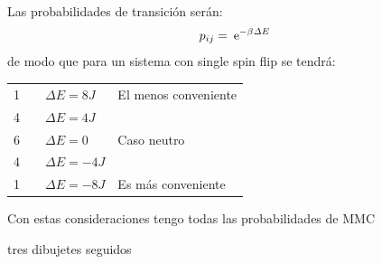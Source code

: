 \documentclass[10pt,oneside]{CBFT_book}
\begin{document}
Las probabilidades de transición serán:
\[
	p_{ij} = \:\mathrm{e}^{-\beta \Delta E }
\]
de modo que para un sistema con single spin flip se tendrá:
\begin{center}
\begin{tabular}{llll}
1 &  & $ \Delta E = 8J $  & El menos conveniente \\
4 &  & $ \Delta E = 4J $ &  \\
6 &  & $ \Delta E = 0 $ & Caso neutro \\
4 &  & $ \Delta E = -4J $ &  \\
1 &  & $ \Delta E = -8J $ & Es más conveniente
\end{tabular}
\end{center}


Con estas consideraciones tengo todas las probabilidades de MMC

tres dibujetes seguidos
\end{document}
